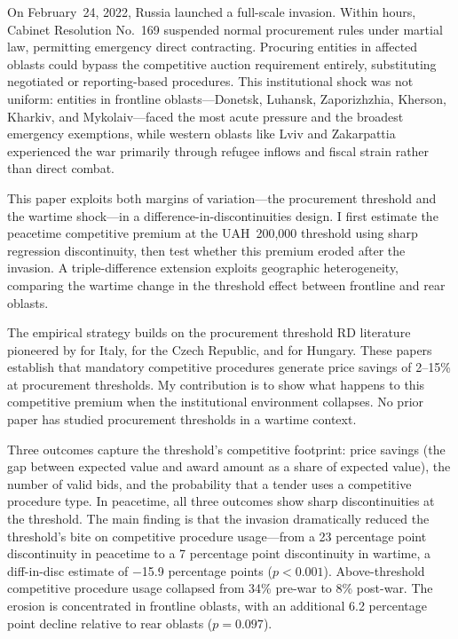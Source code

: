 \documentclass[12pt]{article}
\begin{document}
On February~24, 2022, Russia launched a full-scale invasion. Within hours, Cabinet Resolution No.~169 suspended normal procurement rules under martial law, permitting emergency direct contracting. Procuring entities in affected oblasts could bypass the competitive auction requirement entirely, substituting negotiated or reporting-based procedures. This institutional shock was not uniform: entities in frontline oblasts---Donetsk, Luhansk, Zaporizhzhia, Kherson, Kharkiv, and Mykolaiv---faced the most acute pressure and the broadest emergency exemptions, while western oblasts like Lviv and Zakarpattia experienced the war primarily through refugee inflows and fiscal strain rather than direct combat.

This paper exploits both margins of variation---the procurement threshold and the wartime shock---in a difference-in-discontinuities design. I first estimate the peacetime competitive premium at the UAH~200,000 threshold using sharp regression discontinuity, then test whether this premium eroded after the invasion. A triple-difference extension exploits geographic heterogeneity, comparing the wartime change in the threshold effect between frontline and rear oblasts.

The empirical strategy builds on the procurement threshold RD literature pioneered by \citet{Coviello2014} for Italy, \citet{Palguta2017} for the Czech Republic, and \citet{Szucs2017} for Hungary. These papers establish that mandatory competitive procedures generate price savings of 2--15\% at procurement thresholds. My contribution is to show what happens to this competitive premium when the institutional environment collapses. No prior paper has studied procurement thresholds in a wartime context.

Three outcomes capture the threshold's competitive footprint: price savings (the gap between expected value and award amount as a share of expected value), the number of valid bids, and the probability that a tender uses a competitive procedure type. In peacetime, all three outcomes show sharp discontinuities at the threshold. The main finding is that the invasion dramatically reduced the threshold's bite on competitive procedure usage---from a 23 percentage point discontinuity in peacetime to a 7 percentage point discontinuity in wartime, a diff-in-disc estimate of $-$15.9 percentage points ($p < 0.001$). Above-threshold competitive procedure usage collapsed from 34\% pre-war to 8\% post-war. The erosion is concentrated in frontline oblasts, with an additional 6.2 percentage point decline relative to rear oblasts ($p = 0.097$).
\end{document}
